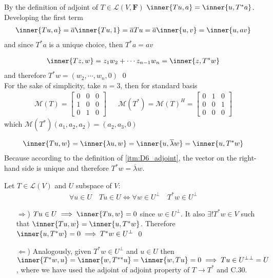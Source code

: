 \exo{} By the definition of adjoint of $T\in \mathcal{L}(V,\mathbf{F})$ $\inner{Tu, a}=\inner{u, T^*a}$. Developing the first term
\begin{align*}
\inner{Tu, a} = \overline{a}\inner{Tu, 1} = \overline{a}Tu = \overline{a}\inner{u,v} = \inner{u,av}
\end{align*}
and since $T^*a$ is a unique choice, then $T^*a = av$

\exo{}  
\begin{align*}
\inner{Tz,w} = z_1w_2 + \cdots z_{n-1}w_n = \inner{z, T^*w}
\end{align*}
and therefore $T^*w = (w_2,\cdots, w_n, 0)$ \qed \\

For the sake of simplicity, take $n=3$, then for standard basis
\begin{align*}
\mathcal{M}(T) = \begin{bmatrix}
0 & 0 & 0 \\
1 & 0 & 0 \\
0 & 1& 0
\end{bmatrix}
&&
\mathcal{M}(T^*) = \mathcal{M}(T)^H = \begin{bmatrix}
0 & 1 & 0 \\
0 & 0 & 1 \\
0 & 0& 0
\end{bmatrix}
\end{align*}
which $\mathcal{M}(T^*)(a_1,a_2,a_2) = (a_2, a_3, 0)$

\exo{\label{exo:6_28}}  
\begin{align*}
\inner{Tu,w} = \inner{\lambda u,w} = \inner{u,\overline{\lambda}w} =  \inner{u,T^*w}
\end{align*}
Because according to the definition of \ref{itm:D6_adjoint}, the vector on the right-hand side is unique and therefore $T^*w = \overline{\lambda}w$.

\exo{} Let $T\in\mathcal{L}(V)$ and $U$ subspace of $V$:
\begin{align*}
\forall u\in U \quad Tu\in U \iff \forall w\in U^\perp \quad T^*w\in U^\perp
\end{align*}

\begin{enumerate}
\item[$\Rightarrow$)] $Tu\in U \implies \inner{Tu,w}=0$ since $w\in U^\perp$. It also $\exists!T^*w\in V$ such that $\inner{Tu,w}=\inner{u,T^*w}$. Therefore $\inner{u,T^*w}=0 \implies T^*w\in U^\perp$ \qed
\item[$\Leftarrow$)] Analogously, given $T^*w\in U^\perp$ and $u\in U$ then $\inner{T^*w,u} = \inner{w, T^{**}u} = \inner{w, Tu} = 0 \implies Tu\in U^{\perp\perp}=U$, where we have used the adjoint of adjoint property of $T\to T^*$ and C.30.
\end{enumerate}

